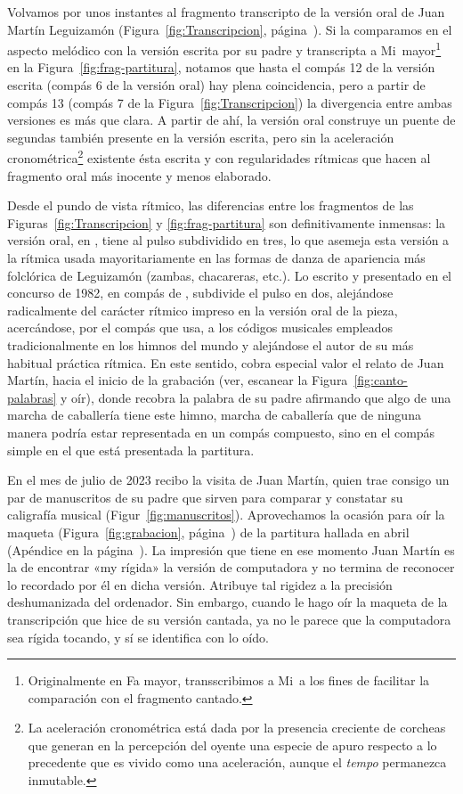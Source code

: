Volvamos por unos instantes al fragmento transcripto de la versión oral de Juan Martín Leguizamón (Figura~\ref{fig:Transcripcion}, página~\pageref{fig:Transcripcion}). Si la comparamos en el aspecto melódico con la versión escrita por su padre y transcripta a Mi\bemoltxt\ mayor\footnote{Originalmente en Fa mayor, transscribimos a Mi\bemoltxt\ a los fines de facilitar la comparación con el fragmento cantado.} en la Figura~\ref{fig:frag-partitura}, notamos que hasta el compás 12 de la versión escrita (compás 6 de la versión oral) hay plena coincidencia, pero a partir de compás 13 (compás 7 de la Figura~\ref{fig:Transcripcion}) la divergencia entre ambas versiones es más que clara. A partir de ahí, la versión oral construye un puente de segundas  también presente en la versión escrita, pero sin la aceleración cronométrica\footnote{La aceleración cronométrica está dada por la presencia creciente de corcheas que generan en la percepción del oyente una especie de apuro respecto a lo precedente que es vivido como una aceleración, aunque el \emph{tempo} permanezca inmutable.} existente ésta escrita y con regularidades rítmicas que hacen al fragmento oral más inocente y menos elaborado.

Desde el pundo de vista rítmico, las diferencias entre los fragmentos de las Figuras~\ref{fig:Transcripcion} y \ref{fig:frag-partitura} son definitivamente inmensas: la versión oral, en , tiene al pulso subdividido en tres, lo que asemeja esta versión a la rítmica usada mayoritariamente en las formas de danza de apariencia más folclórica de Leguizamón (zambas, chacareras, etc.). Lo escrito y presentado en el concurso de 1982, en compás de , subdivide el pulso en dos, alejándose radicalmente del carácter rítmico impreso en la versión oral de la pieza, acercándose, por el compás que usa, a los códigos musicales empleados tradicionalmente en los himnos del mundo y alejándose el autor de su más habitual práctica rítmica. En este sentido, cobra especial valor el relato de Juan Martín, hacia el inicio de la grabación (ver, escanear la Figura~\ref{fig:canto-palabras} y oír), donde recobra la palabra de su padre afirmando que algo de una marcha de caballería tiene este himno, marcha de caballería que de ninguna manera podría estar representada en un compás compuesto, sino en el compás simple en el que está presentada la partitura.

En el mes de julio de 2023 recibo la visita de Juan Martín, quien trae consigo un par de manuscritos de su padre que sirven para comparar y constatar su caligrafía musical (Figur~\ref{fig:manuscritos}). Aprovechamos la ocasión para oír la maqueta (Figura~\ref{fig:grabacion}, página~\pageref{fig:grabacion}) de la partitura hallada en abril (Apéndice en la página~\pageref{apx:partitura}). La impresión que tiene en ese momento Juan Martín es la de encontrar «my rígida» la versión de computadora y no termina de reconocer lo recordado por él en dicha versión. Atribuye tal rigidez a la precisión deshumanizada del ordenador. Sin embargo, cuando le hago oír la maqueta de la transcripción que hice de su versión cantada, ya no le parece que la computadora sea rígida tocando, y sí se identifica con lo oído.

